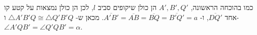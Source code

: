 כמו בהוכחה הראשונה, 
$A', B', Q'$
הן כולן שיקופים סביב
$l$,
לכן הן כולן נמצאות על קטע קו אחד
$\overline{DQ'}$,
ו-%
$\overline{A'B'}=\overline{AB}=\overline{BQ}=\overline{B'Q'}=a$.
מכאן ש-%
$\triangle A'B'Q\cong\triangle Q'B'Q$
ו-%
$\angle A'QB'=\angle Q'QB'=\alpha$.
%
%
%
%
%
%
%
%
%
%
%
%

